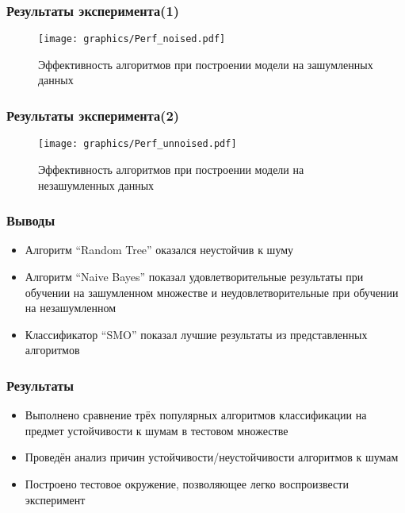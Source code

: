 \documentclass{beamer}
\begin{document}
  \begin{frame}
    \frametitle{Результаты эксперимента(1)}
    \begin{figure}[ht!]
	\texttt{[image: graphics/Perf\_noised.pdf]}
	\captionsetup{justification=centering}
	\caption{Эффективность алгоритмов при построении модели на зашумленных 			данных}
	\label{fig:perf1}
	\end{figure}
  \end{frame}
  
  \begin{frame}
    \frametitle{Результаты эксперимента(2)}
    \begin{figure}[ht!]
	\texttt{[image: graphics/Perf\_unnoised.pdf]}
	\captionsetup{justification=centering}
	\caption{Эффективность алгоритмов при построении модели на незашумленных 			данных}
	\label{fig:perf2}
	\end{figure}
  \end{frame}
  
  \begin{frame}
    \frametitle{Выводы}
    \begin{itemize}
	\item{Алгоритм ``Random Tree'' оказался неустойчив к шуму}
	\item{Алгоритм ``Naive Bayes'' показал удовлетворительные результаты при обучении на зашумленном множестве и неудовлетворительные при обучении на незашумленном}
	\item{Классификатор ``SMO'' показал лучшие результаты из представленных алгоритмов}
	\end{itemize}
  \end{frame}
  
  \begin{frame}
    \frametitle{Результаты}
    \begin{itemize}

		\item{Выполнено сравнение трёх популярных алгоритмов классификации на 				предмет устойчивости к шумам в тестовом множестве}
		
    	\item{Проведён анализ причин устойчивости/неустойчивости алгоритмов к 					шумам}
    	
    	\item{Построено тестовое окружение, позволяющее легко воспроизвести 				эксперимент}
    	
    \end{itemize}
  \end{frame}
  
\end{document}
